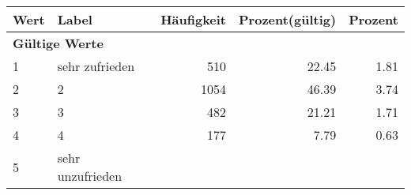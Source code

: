      \begin{longtable}{lXrrr}
     \toprule
     \textbf{Wert} & \textbf{Label} & \textbf{Häufigkeit} & \textbf{Prozent(gültig)} & \textbf{Prozent} \\
     \endhead
     \midrule
     \multicolumn{5}{l}{\textbf{Gültige Werte}}\\

     1 &
     \multicolumn{1}{X}{ sehr zufrieden   } &


       \num{510} &
       \num[round-mode=places,round-precision=2]{22.45} &
         \num[round-mode=places,round-precision=2]{1.81} \\

     2 &
     \multicolumn{1}{X}{ 2   } &


       \num{1054} &
       \num[round-mode=places,round-precision=2]{46.39} &
         \num[round-mode=places,round-precision=2]{3.74} \\

     3 &
     \multicolumn{1}{X}{ 3   } &


       \num{482} &
       \num[round-mode=places,round-precision=2]{21.21} &
         \num[round-mode=places,round-precision=2]{1.71} \\

     4 &
     \multicolumn{1}{X}{ 4   } &


       \num{177} &
       \num[round-mode=places,round-precision=2]{7.79} &
         \num[round-mode=places,round-precision=2]{0.63} \\

     5 &
     \multicolumn{1}{X}{ sehr unzufrieden   } &



\end{longtable}
